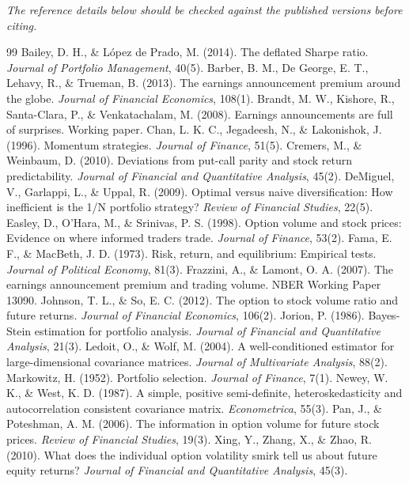 \bigskip\noindent\emph{The reference details below should be checked against the published versions before citing.}\par\medskip
\begin{thebibliography}{99}
\setlength{\itemsep}{2pt}
\small
{} Bailey, D. H., \& L{\'o}pez de Prado, M. (2014). The deflated Sharpe ratio. \emph{Journal of Portfolio Management}, 40(5).
 Barber, B. M., De George, E. T., Lehavy, R., \& Trueman, B. (2013). The earnings announcement premium around the globe. \emph{Journal of Financial Economics}, 108(1).
 Brandt, M. W., Kishore, R., Santa-Clara, P., \& Venkatachalam, M. (2008). Earnings announcements are full of surprises. Working paper.
 Chan, L. K. C., Jegadeesh, N., \& Lakonishok, J. (1996). Momentum strategies. \emph{Journal of Finance}, 51(5).
 Cremers, M., \& Weinbaum, D. (2010). Deviations from put-call parity and stock return predictability. \emph{Journal of Financial and Quantitative Analysis}, 45(2).
 DeMiguel, V., Garlappi, L., \& Uppal, R. (2009). Optimal versus naive diversification: How inefficient is the 1/N portfolio strategy? \emph{Review of Financial Studies}, 22(5).
 Easley, D., O'Hara, M., \& Srinivas, P. S. (1998). Option volume and stock prices: Evidence on where informed traders trade. \emph{Journal of Finance}, 53(2).
 Fama, E. F., \& MacBeth, J. D. (1973). Risk, return, and equilibrium: Empirical tests. \emph{Journal of Political Economy}, 81(3).
 Frazzini, A., \& Lamont, O. A. (2007). The earnings announcement premium and trading volume. NBER Working Paper 13090.
 Johnson, T. L., \& So, E. C. (2012). The option to stock volume ratio and future returns. \emph{Journal of Financial Economics}, 106(2).
 Jorion, P. (1986). Bayes-Stein estimation for portfolio analysis. \emph{Journal of Financial and Quantitative Analysis}, 21(3).
 Ledoit, O., \& Wolf, M. (2004). A well-conditioned estimator for large-dimensional covariance matrices. \emph{Journal of Multivariate Analysis}, 88(2).
 Markowitz, H. (1952). Portfolio selection. \emph{Journal of Finance}, 7(1).
 Newey, W. K., \& West, K. D. (1987). A simple, positive semi-definite, heteroskedasticity and autocorrelation consistent covariance matrix. \emph{Econometrica}, 55(3).
 Pan, J., \& Poteshman, A. M. (2006). The information in option volume for future stock prices. \emph{Review of Financial Studies}, 19(3).
 Xing, Y., Zhang, X., \& Zhao, R. (2010). What does the individual option volatility smirk tell us about future equity returns? \emph{Journal of Financial and Quantitative Analysis}, 45(3).
\end{thebibliography}
